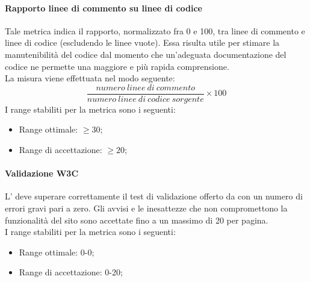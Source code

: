 			\paragraph{Rapporto linee di commento su linee di codice}
			Tale metrica indica il rapporto, normalizzato fra 0 e 100, tra linee di commento e linee di codice (escludendo le linee vuote).
			Essa risulta utile per stimare la manutenibilità del codice dal momento che un'adeguata documentazione del codice ne permette una maggiore e più rapida comprensione.
			\\La misura viene effettuata nel modo seguente:
			\begin{equation}
					\frac{numero~linee~di~commento}{numero~linee~di~codice~sorgente}\times{100}
				\end{equation}
			I range stabiliti per la metrica sono i seguenti:
			\begin{itemize}
				\item Range ottimale: $\geq{30}$;
				\item Range di accettazione: $\geq{20}$;
			\end{itemize}
			
			\paragraph{Validazione W3C}
			L' deve superare correttamente il test di validazione offerto da  con un numero di errori gravi pari a zero. Gli avvisi e le inesattezze che non compromettono la funzionalità del sito sono accettate fino a un massimo di 20 per pagina.
			\\I range stabiliti per la metrica sono i seguenti:
			\begin{itemize}
				\item Range ottimale: 0-0;
				\item Range di accettazione: 0-20;
			\end{itemize}

